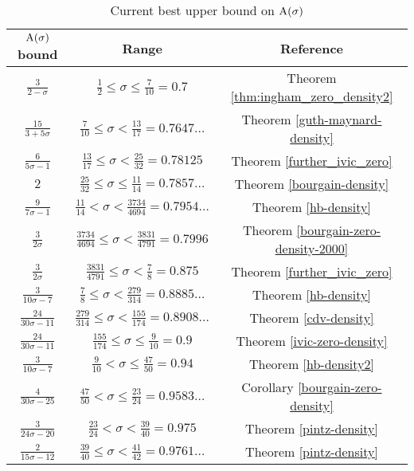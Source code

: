 \begin{table}[ht]
    \def\arraystretch{1.3}
    \centering
    \caption{Current best upper bound on $\mathrm{A}(\sigma)$}
    \begin{tabular}{|c|c|c|}
    \hline
    $\mathrm{A}(\sigma)$ bound & Range & Reference\\
    \hline
    $\frac{3}{2 - \sigma}$ & $\frac{1}{2} \leq \sigma \le \frac{7}{10} = 0.7$ & Theorem \ref{thm:ingham_zero_density2}\\
    \hline
    $\frac{15}{3+5\sigma}$ & $\frac{7}{10} \leq \sigma < \frac{13}{17} = 0.7647\ldots$ & Theorem \ref{guth-maynard-density}\\
    \hline
    $\frac{6}{5\sigma - 1}$ & $\frac{13}{17} \le \sigma < \frac{25}{32} = 0.78125$ & Theorem \ref{further_ivic_zero} \\
    \hline
    $2$ & $\frac{25}{32} \le \sigma \le \frac{11}{14} = 0.7857\ldots$ & Theorem \ref{bourgain-density} \\
    \hline
    $\frac{9}{7\sigma - 1}$ & $\frac{11}{14} < \sigma < \frac{3734}{4694} = 0.7954\ldots$ & Theorem \ref{hb-density} \\
    \hline
    $\frac{3}{2\sigma}$ & $\frac{3734}{4694} \le \sigma < \frac{3831}{4791} = 0.7996$ & Theorem \ref{bourgain-zero-density-2000} \\
    \hline
    $\frac{3}{2\sigma}$ & $\frac{3831}{4791} \le \sigma < \frac{7}{8} = 0.875$ & Theorem \ref{further_ivic_zero} \\
    \hline
    $\frac{3}{10\sigma - 7}$ & $\frac{7}{8} \le \sigma < \frac{279}{314} = 0.8885\ldots$ & Theorem \ref{hb-density}\\
    \hline
    $\frac{24}{30\sigma - 11}$ & $\frac{279}{314} \le \sigma < \frac{155}{174} = 0.8908\ldots$ & Theorem \ref{cdv-density}  \\
    \hline
    $\frac{24}{30\sigma - 11}$& $\frac{155}{174} \le \sigma \le \frac{9}{10} = 0.9$ & Theorem \ref{ivic-zero-density}\\
    \hline
    $\frac{3}{10\sigma - 7}$ & $\frac{9}{10} < \sigma \le \frac{47}{50} = 0.94$ & Theorem \ref{hb-density2}\\
    \hline
    $\frac{4}{30\sigma - 25}$ & $\frac{47}{50} < \sigma \le \frac{23}{24} = 0.9583\ldots$ & Corollary \ref{bourgain-zero-density} \\
    \hline
    $\frac{3}{24\sigma - 20}$ & $\frac{23}{24} < \sigma < \frac{39}{40} = 0.975$ & Theorem \ref{pintz-density} \\
    \hline
    $\frac{2}{15\sigma - 12}$ & $\frac{39}{40} \leq \sigma < \frac{41}{42} = 0.9761\ldots$ & Theorem \ref{pintz-density} \\

\end{tabular}
\end{table}
